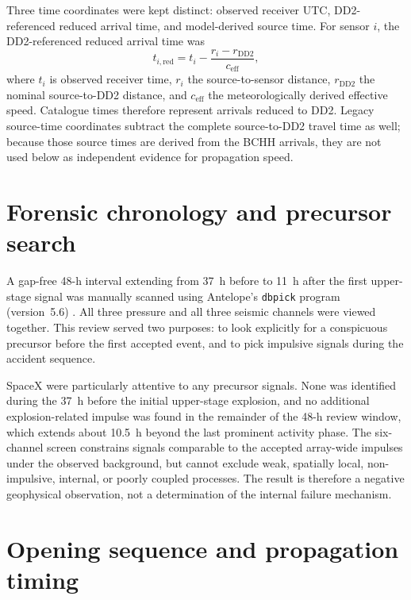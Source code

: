\documentclass[]{seismica}
\begin{document}
Three time coordinates were kept distinct: observed receiver UTC,
DD2-referenced reduced arrival time, and model-derived source time. For sensor
$i$, the DD2-referenced reduced arrival time was
\begin{equation}
 t_{i,\mathrm{red}}=t_i-\frac{r_i-r_{\mathrm{DD2}}}{c_{\mathrm{eff}}},
 \label{eq:reduced_time}
\end{equation}
where $t_i$ is observed receiver time, $r_i$ the source-to-sensor distance,
$r_{\mathrm{DD2}}$ the nominal source-to-DD2 distance, and
$c_{\mathrm{eff}}$ the meteorologically derived effective speed. Catalogue
times therefore represent arrivals reduced to DD2. Legacy source-time
coordinates subtract the complete source-to-DD2 travel time as well; because
those source times are derived from the BCHH arrivals, they are not used below
as independent evidence for propagation speed.

\FloatBarrier


\section{Forensic chronology and precursor search}
\label{sec:precursor}

A gap-free 48-h interval extending from 37~h before to 11~h after the first
upper-stage signal was manually scanned using Antelope's \texttt{dbpick}
program (version~5.6) \citep{brtt_antelope}. All three pressure and all three
seismic channels were viewed together. This review served two purposes: to
look explicitly for a conspicuous precursor before the first accepted event,
and to pick impulsive signals during the accident sequence.

SpaceX were particularly attentive to any precursor signals. None was
identified during the 37~h before the initial upper-stage explosion, and no
additional explosion-related impulse was found in the remainder of the 48-h
review window, which extends about 10.5~h beyond the last prominent activity
phase. The six-channel screen constrains signals comparable to the accepted
array-wide impulses under the observed background, but cannot exclude weak,
spatially local, non-impulsive, internal, or poorly coupled processes. The
result is therefore a negative geophysical observation, not a determination
of the internal failure mechanism.


\section{Opening sequence and propagation timing}
\label{sec:opening_timing}
\end{document}
